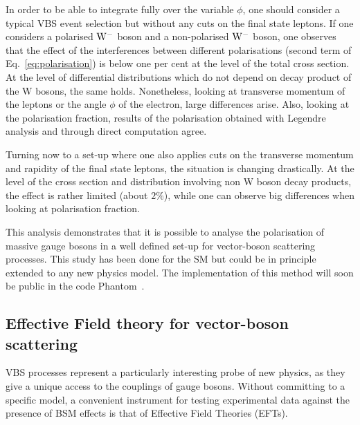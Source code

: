 In order to be able to integrate fully over the variable $\phi$, one should consider a typical VBS event selection but without any cuts on the final state leptons.
If one considers a polarised ${\rm W^-}$ boson and a non-polarised ${\rm W^-}$ boson, one observes that the effect of the interferences between different polarisations (second term of Eq.~\eqref{eq:polarisation}) is below one per cent at the level of the total cross section.
At the level of differential distributions which do not depend on decay product of the W bosons, the same holds.
Nonetheless, looking at transverse momentum of the leptons or the angle $\phi$ of the electron, large differences arise.
Also, looking at the polarisation fraction, results of the polarisation obtained with Legendre analysis and through direct computation agree.

Turning now to a set-up where one also applies cuts on the transverse momentum and rapidity of the final state leptons, the situation is changing drastically.
At the level of the cross section and distribution involving non W boson decay products, the effect is rather limited (about $2\%$),
while one can observe big differences when looking at polarisation fraction.

This analysis demonstrates that it is possible to analyse the polarisation of massive gauge bosons in a well defined set-up for vector-boson scattering processes.
This study has been done for the SM but could be in principle extended to any new physics model.
The implementation of this method will soon be public in the code Phantom~\cite{Ballestrero:2007xq}.

\subsection{Effective Field theory for vector-boson scattering}

VBS processes represent a particularly interesting probe of new physics, as they give a unique access to the couplings of gauge bosons.
Without committing to a specific model, a convenient instrument for testing experimental data against the presence of BSM effects is that of Effective Field Theories (EFTs).

